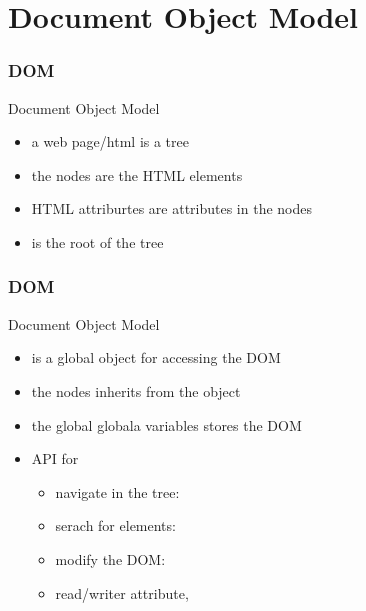 \section{Document Object Model}

\begin{frame}[fragile]
\frametitle{DOM}
\color{structure}
Document Object Model\\
\begin{itemize}\color{structure}
  \item a web page/html is a tree
  \item the nodes are the HTML elements
  \item HTML attriburtes are attributes in the nodes
  \item {} is the root of the tree
\end{itemize}
\end{frame}

\begin{frame}[fragile]
\frametitle{DOM}
\color{structure}
Document Object Model\\
\begin{itemize}\color{structure}
\item {} is a global object for accessing the DOM
\item the nodes inherits from the  object
\item the global globala variables  stores the DOM
\item API for
  \begin{itemize}
    \item navigate in the tree: 
    \item serach for elements: 
    \item modify the DOM: 
    \item read/writer attribute, 
  \end{itemize}
\end{itemize}
\end{frame}

